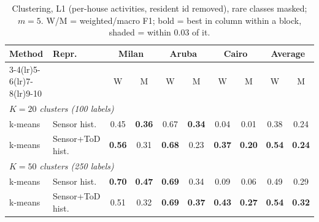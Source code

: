 \begin{table}[H]
\centering\small
\caption{Clustering, L1 (per-house activities, resident id removed), rare classes masked; $m=5$. W/M = weighted/macro F1; bold = best in column within a block, shaded = within 0.03 of it.}
\label{tab:clu_l1_masked_m5}
\setlength{\tabcolsep}{3.5pt}
\begin{tabular}{llcc|cc|cc|cc}
\toprule
Method & Repr. & \multicolumn{2}{c}{Milan} & \multicolumn{2}{c}{Aruba} & \multicolumn{2}{c}{Cairo} & \multicolumn{2}{c}{Average} \\
\cmidrule(lr){3-4}\cmidrule(lr){5-6}\cmidrule(lr){7-8}\cmidrule(lr){9-10}
 & & W & M & W & M & W & M & W & M \\
\midrule
\multicolumn{10}{l}{\textit{$K = 20$ clusters (100 labels)}} \\
\midrule
k-means & Sensor hist. & 0.45 & \cellcolor{blue!12}\textbf{0.36} & \cellcolor{blue!12}0.67 & \cellcolor{blue!12}\textbf{0.34} & 0.04 & 0.01 & 0.38 & \cellcolor{blue!12}0.24 \\
k-means & Sensor+ToD hist. & \cellcolor{blue!12}\textbf{0.56} & 0.31 & \cellcolor{blue!12}\textbf{0.68} & 0.23 & \cellcolor{blue!12}\textbf{0.37} & \cellcolor{blue!12}\textbf{0.20} & \cellcolor{blue!12}\textbf{0.54} & \cellcolor{blue!12}\textbf{0.24} \\
\midrule
\multicolumn{10}{l}{\textit{$K = 50$ clusters (250 labels)}} \\
\midrule
k-means & Sensor hist. & \cellcolor{blue!12}\textbf{0.70} & \cellcolor{blue!12}\textbf{0.47} & \cellcolor{blue!12}\textbf{0.69} & \cellcolor{blue!12}0.34 & 0.09 & 0.06 & 0.49 & \cellcolor{blue!12}0.29 \\
k-means & Sensor+ToD hist. & 0.51 & 0.32 & \cellcolor{blue!12}\textbf{0.69} & \cellcolor{blue!12}\textbf{0.37} & \cellcolor{blue!12}\textbf{0.43} & \cellcolor{blue!12}\textbf{0.27} & \cellcolor{blue!12}\textbf{0.54} & \cellcolor{blue!12}\textbf{0.32} \\
\bottomrule
\end{tabular}
\end{table}


